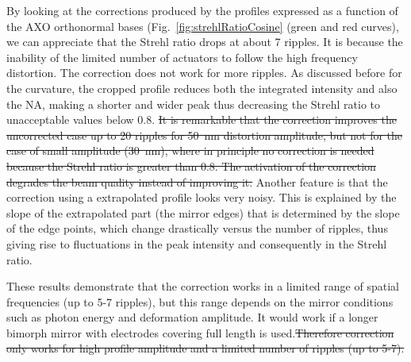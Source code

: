 \documentclass{iucr}
\newcommand{\replace}[2]{{\color{blue}#1}{\color{blue}\sout{#2}}}
\begin{document}
By looking at the corrections produced by the profiles expressed as a function of the AXO orthonormal bases (Fig.~\ref{fig:strehlRatioCosine} (green and red curves), we can appreciate that the Strehl ratio drops at about 7 ripples. It is because the inability of the limited number of actuators to follow the high frequency distortion. The correction does not work for more ripples. As discussed before for the curvature, the cropped profile reduces both the integrated intensity and also the NA, making a shorter and wider peak thus decreasing the Strehl ratio to unacceptable values below 0.8. \replace{}{It is remarkable that the correction improves the uncorrected case up to 20 ripples for 50~nm distortion amplitude, but not for the case of small amplitude (30~nm), where in principle no correction is needed because the Strehl ratio is greater than 0.8. The activation of the correction degrades the beam quality instead of improving it.}
Another feature is that the correction using a extrapolated profile looks very noisy. This is explained by the slope of the extrapolated part (the mirror edges) that is determined by the slope of the edge points, which change drastically versus the number of ripples, thus giving rise to fluctuations in the peak intensity and consequently in the Strehl ratio.


\replace{These results demonstrate that the correction works in a limited range of spatial frequencies (up to 5-7 ripples), but this range depends on the mirror conditions such as photon energy and deformation amplitude. It would work if a longer bimorph mirror with electrodes covering full length is used.}{Therefore correction only works for high profile amplitude and a limited number of ripples (up to 5-7).}
 
\end{document}
